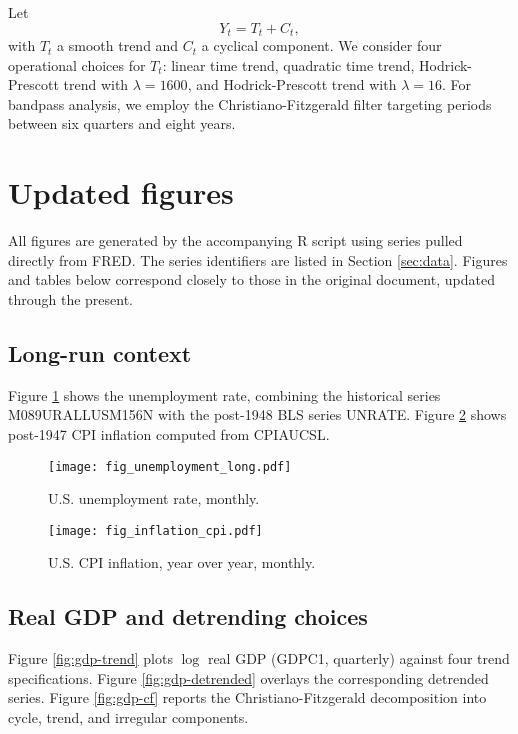 \documentclass[11pt]{article}
\begin{document}
Let
\begin{equation}
Y_t = T_t + C_t, \label{eq:trend-cycle}
\end{equation}
with $T_t$ a smooth trend and $C_t$ a cyclical component. We consider four operational choices for $T_t$: linear time trend, quadratic time trend, Hodrick-Prescott trend with $\lambda=1600$, and Hodrick-Prescott trend with $\lambda=16$. For bandpass analysis, we employ the Christiano-Fitzgerald filter targeting periods between six quarters and eight years.

\section{Updated figures}

All figures are generated by the accompanying R script using series pulled directly from FRED. The series identifiers are listed in Section \ref{sec:data}. Figures and tables below correspond closely to those in the original document, updated through the present.

\subsection{Long-run context}

Figure \ref{fig:unemp} shows the unemployment rate, combining the historical series M089URALLUSM156N with the post-1948 BLS series UNRATE. Figure \ref{fig:infl} shows post-1947 CPI inflation computed from CPIAUCSL.

\begin{figure}[h]
\centering
\texttt{[image: fig\_unemployment\_long.pdf]}
\caption{U.S. unemployment rate, monthly.}
\label{fig:unemp}
\end{figure}

\begin{figure}[h]
\centering
\texttt{[image: fig\_inflation\_cpi.pdf]}
\caption{U.S. CPI inflation, year over year, monthly.}
\label{fig:infl}
\end{figure}

\subsection{Real GDP and detrending choices}

Figure \ref{fig:gdp-trend} plots $\log$ real GDP (GDPC1, quarterly) against four trend specifications. Figure \ref{fig:gdp-detrended} overlays the corresponding detrended series. Figure \ref{fig:gdp-cf} reports the Christiano-Fitzgerald decomposition into cycle, trend, and irregular components.
\end{document}
